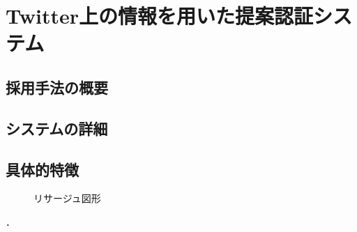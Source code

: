 \chapter{Twitter上の情報を用いた提案認証システム}\label{chap:system}

\section{採用手法の概要}
\section{システムの詳細}
\section{具体的特徴}

\begin{figure}[th]
\begin{center}
\caption{リサージュ図形}
\end{center}
\label{fig:lissajous}
\end{figure}

\cite{ipsj-thesisformat}．

\newpage


